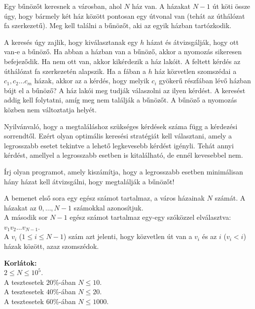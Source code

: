 ﻿





Egy bűnözőt keresnek a városban, ahol $N$ ház van. A házakat $N-1$ út köti össze úgy, hogy bármely két ház között pontosan egy útvonal van (tehát az úthálózat fa szerkezetű).
Meg kell találni a bűnözőt, aki az egyik házban tartózkodik.


A keresés úgy zajlik, hogy kiválasztanak egy $h$ házat és átvizsgálják, hogy ott van-e a bűnöző. Ha abban a házban van a bűnöző, akkor a nyomozás sikeresen befejeződik. Ha nem ott van, akkor kikérdezik a ház lakóit. A feltett kérdés az úthálózat fa szerkezetén alapszik. Ha a fában a $h$ ház közvetlen szomszédai a $c_1, c_2 \ldots c_m$ házak, akkor az a kérdés, hogy melyik $c_i$ gyökerű részfában lévő házban bújt el a bűnöző? A ház lakói meg tudják válaszolni az ilyen kérdést.
A keresést addig kell folytatni, amíg meg nem találják a bűnözőt. A bűnöző a nyomozás közben nem változtatja helyét.

Nyilvánvaló, hogy a megtaláláshoz szükséges kérdések száma függ a kérdezési sorrendtől.
Ezért olyan optimális keresési stratégiát kell választani, amely a legrosszabb esetet tekintve a lehető legkevesebb kérdést igényli. 
Tehát annyi kérdést, amellyel a legrosszabb esetben is kitalálható, de ennél kevesebbel nem.

Írj olyan programot, amely kiszámítja, hogy a legrosszabb esetben minimálisan hány házat kell átvizsgálni, hogy megtalálják a bűnözőt! 


A bemenet első sora egy egész számot tartalmaz, a város házainak $N$ számát. A házakat az $0, \ldots,N-1$ számokkal azonosítjuk.\\
A második sor $N-1$ egész számot tartalmaz egy-egy szóközzel elválasztva: $v_1 v_2 \ldots v_{N-1}$.\\
A $v_i$ ($1 \leq i \leq N-1$) szám azt jelenti, hogy közvetlen út van a $v_i$ és az $i$ ($v_i < i$) házak között, azaz szomszédok.

\smallskip
\noindent \textbf{Korlátok:}\\
$2 \leq N \leq 10^5$.\\
A tesztesetek $20\%$-ában  $N \leq 10$.\\
A tesztesetek $40\%$-ában   $N \leq 20$.\\
A tesztesetek $60\%$-ában   $N \leq 1000$.

